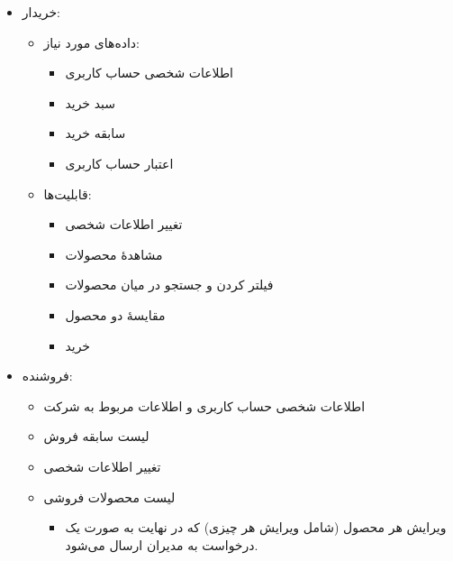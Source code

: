\documentclass[]{article}
\begin{document}
\begin{itemize}
\item
خریدار:

\begin{itemize}

\item
داده‌های مورد نیاز:

\begin{itemize}[label={$\blacksquare$}]

\item
اطلاعات شخصی حساب کاربری

\item
سبد خرید

\item
سابقه خرید

\item
اعتبار حساب کاربری

\end{itemize}

\item
قابلیت‌ها:

\begin{itemize}[label={$\blacksquare$}]

\item
تغییر اطلاعات شخصی

\item
مشاهدهٔ محصولات

\item
فیلتر کردن و جستجو در میان محصولات

\item
مقایسهٔ دو محصول
\item
خرید

\end{itemize}

\end{itemize}


\item
فروشنده:

\begin{itemize}
\item
اطلاعات شخصی حساب کاربری و اطلاعات مربوط به شرکت

\item
لیست سابقه فروش

\item
تغییر اطلاعات شخصی

\item
لیست محصولات فروشی

\begin{itemize}[label={$\blacksquare$}]
\item
ویرایش هر محصول (شامل ویرایش هر چیزی) که در نهایت به صورت یک درخواست به مدیران ارسال می‌شود.



\end{itemize}
\end{itemize}
\end{itemize}
\end{document}
